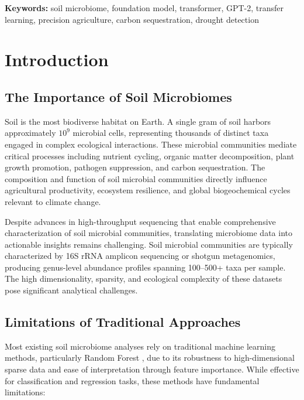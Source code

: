 \documentclass[11pt,a4paper]{article}
\begin{document}
\textbf{Keywords:} soil microbiome, foundation model, transformer, GPT-2, transfer learning, precision agriculture, carbon sequestration, drought detection

\section{Introduction}

\subsection{The Importance of Soil Microbiomes}

Soil is the most biodiverse habitat on Earth. A single gram of soil harbors approximately $10^9$ microbial cells, representing thousands of distinct taxa engaged in complex ecological interactions. These microbial communities mediate critical processes including nutrient cycling, organic matter decomposition, plant growth promotion, pathogen suppression, and carbon sequestration. The composition and function of soil microbial communities directly influence agricultural productivity, ecosystem resilience, and global biogeochemical cycles relevant to climate change.

Despite advances in high-throughput sequencing that enable comprehensive characterization of soil microbial communities, translating microbiome data into actionable insights remains challenging. Soil microbial communities are typically characterized by 16S rRNA amplicon sequencing or shotgun metagenomics, producing genus-level abundance profiles spanning 100--500+ taxa per sample. The high dimensionality, sparsity, and ecological complexity of these datasets pose significant analytical challenges.

\subsection{Limitations of Traditional Approaches}

Most existing soil microbiome analyses rely on traditional machine learning methods, particularly Random Forest \citep{breiman2001random}, due to its robustness to high-dimensional sparse data and ease of interpretation through feature importance. While effective for classification and regression tasks, these methods have fundamental limitations:
\end{document}
